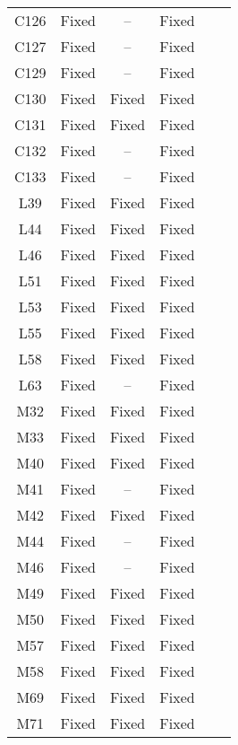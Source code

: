 \begin{table}[!t]
{\begin{tabular}{|c|c|c|c|c|c|}
C126              & Fixed     & --        &Fixed   \\
C127              & Fixed     & --        &Fixed   \\
C129              & Fixed     & --        &Fixed   \\
C130              & Fixed     & Fixed     &Fixed   \\
C131              & Fixed     & Fixed     &Fixed   \\
C132              & Fixed     & --        &Fixed   \\
C133              & Fixed     & --        &Fixed   \\
\hline
L39               & Fixed     & Fixed     &Fixed   \\
L44               & Fixed     & Fixed     &Fixed   \\
L46               & Fixed     & Fixed     &Fixed   \\
L51               & Fixed     & Fixed     &Fixed   \\
L53               & Fixed     & Fixed     &Fixed   \\
L55               & Fixed     & Fixed     &Fixed   \\
L58               & Fixed     & Fixed     &Fixed   \\
L63               & Fixed     & --        &Fixed   \\
\hline
M32               & Fixed     & Fixed     &Fixed   \\
M33               & Fixed     & Fixed     &Fixed   \\
M40               & Fixed     & Fixed     &Fixed   \\
M41               & Fixed     & --        &Fixed   \\
M42               & Fixed     & Fixed     &Fixed   \\
M44               & Fixed     & --        &Fixed   \\
M46               & Fixed     & --        &Fixed   \\
M49               & Fixed     & Fixed     &Fixed   \\
M50               & Fixed     & Fixed     &Fixed   \\
M57               & Fixed     & Fixed     &Fixed   \\
M58               & Fixed     & Fixed     &Fixed   \\
M69               & Fixed     & Fixed     &Fixed   \\
M71               & Fixed     & Fixed     &Fixed   \\

\end{tabular}}
\end{table}
